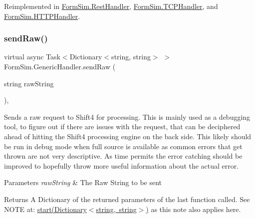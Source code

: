 Reimplemented in \mbox{\hyperlink{class_form_sim_1_1_rest_handler_aaba7a1239d5e4e2eb63e0f24f76341d1}{Form\+Sim.\+Rest\+Handler}}, \mbox{\hyperlink{class_form_sim_1_1_t_c_p_handler_a7762d051722dd2ac8bee1c26043760f3}{Form\+Sim.\+T\+C\+P\+Handler}}, and \mbox{\hyperlink{class_form_sim_1_1_h_t_t_p_handler_a1b87e232c94cf390f7a9656744006639}{Form\+Sim.\+H\+T\+T\+P\+Handler}}.

\mbox{\label{class_form_sim_1_1_generic_handler_a806d781f9ad046f8f1574b137ffe86e0}} 
\subsubsection{\texorpdfstring{send\+Raw()}{sendRaw()}\hspace{0.1cm}{\footnotesize\ttfamily [1/2]}}
{\footnotesize\ttfamily virtual async Task$<$Dictionary$<$string, string$>$ $>$ Form\+Sim.\+Generic\+Handler.\+send\+Raw (\begin{DoxyParamCaption}\item[{string}]{raw\+String }\end{DoxyParamCaption})\hspace{0.3cm}{\ttfamily [inline]}, {\ttfamily [virtual]}}



Sends a raw request to Shift4 for processing. This is mainly used as a debugging tool, to figure out if there are issues with the request, that can be deciphered ahead of hitting the Shift4 processing engine on the back side. This likely should be run in debug mode when full source is available as common errors that get thrown are not very descriptive. As time permits the error catching should be improved to hopefully throw more useful information about the actual error. 


\begin{DoxyParams}{Parameters}
{\em raw\+String} & The Raw String to be sent\\
\hline
\end{DoxyParams}
\begin{DoxyReturn}{Returns}
A Dictionary of the returned parameters of the last function called. See N\+O\+TE at\+: \mbox{\hyperlink{class_form_sim_1_1_generic_handler_affac9485687a2be1595405d657922532}{start(\+Dictionary$<$string, string$>$)}} as this note also applies here.
\end{DoxyReturn}


